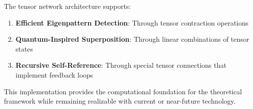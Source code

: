 \documentclass[12pt]{article}
\providecommand{\tightlist}{%
  \setlength{\itemsep}{0pt}\setlength{\parskip}{0pt}}
\begin{document}
The tensor network architecture supports:

\begin{enumerate}
\def\labelenumi{\arabic{enumi}.}
\tightlist
\item
  \textbf{Efficient Eigenpattern Detection}: Through tensor contraction
  operations
\item
  \textbf{Quantum-Inspired Superposition}: Through linear combinations
  of tensor states
\item
  \textbf{Recursive Self-Reference}: Through special tensor connections
  that implement feedback loops
\end{enumerate}

This implementation provides the computational foundation for the
theoretical framework while remaining realizable with current or
near-future technology.
\end{document}
